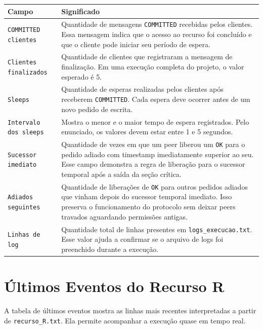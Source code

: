 \documentclass[12pt,a4paper]{article}
\begin{document}
\begin{longtable}{>{\raggedright\arraybackslash}p{5cm} >{\raggedright\arraybackslash}p{9cm}}
\toprule
\textbf{Campo} & \textbf{Significado} \\
\midrule
\texttt{COMMITTED clientes} &
Quantidade de mensagens \texttt{COMMITTED} recebidas pelos clientes. Essa mensagem indica
que o acesso ao recurso foi conclu\'ido e que o cliente pode iniciar seu per\'iodo de espera. \\
\texttt{Clientes finalizados} &
Quantidade de clientes que registraram a mensagem de finaliza\c{c}\~ao. Em uma execu\c{c}\~ao
completa do projeto, o valor esperado \'e 5. \\
\texttt{Sleeps} &
Quantidade de esperas realizadas pelos clientes ap\'os receberem \texttt{COMMITTED}. Cada
espera deve ocorrer antes de um novo pedido de escrita. \\
\texttt{Intervalo dos sleeps} &
Mostra o menor e o maior tempo de espera registrados. Pelo enunciado, os valores devem
estar entre 1 e 5 segundos. \\
\texttt{Sucessor imediato} &
Quantidade de vezes em que um peer liberou um \texttt{OK} para o pedido adiado com timestamp
imediatamente superior ao seu. Esse campo demonstra a regra de libera\c{c}\~ao para o sucessor
temporal ap\'os a sa\'ida da se\c{c}\~ao cr\'itica. \\
\texttt{Adiados seguintes} &
Quantidade de libera\c{c}\~oes de \texttt{OK} para outros pedidos adiados que vinham depois
do sucessor temporal imediato. Isso preserva o funcionamento do protocolo sem deixar peers
travados aguardando permiss\~oes antigas. \\
\texttt{Linhas de log} &
Quantidade total de linhas presentes em \texttt{logs\_execucao.txt}. Esse valor ajuda a
confirmar se o arquivo de logs foi preenchido durante a execu\c{c}\~ao. \\
\bottomrule
\end{longtable}

\section{\'Ultimos Eventos do Recurso R}

A tabela de \'ultimos eventos mostra as linhas mais recentes interpretadas a partir de
\texttt{recurso\_R.txt}. Ela permite acompanhar a execu\c{c}\~ao quase em tempo real.
\end{document}
